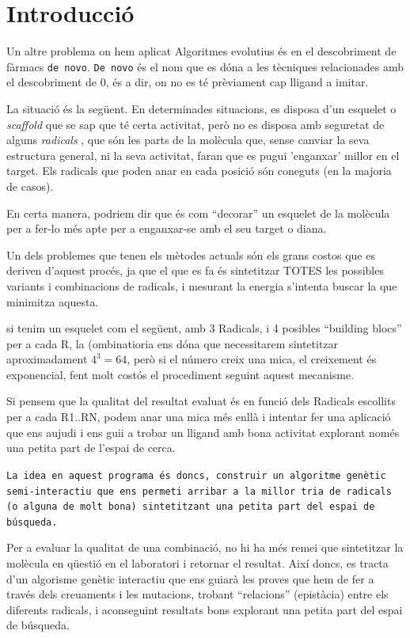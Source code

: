 \documentclass[titlepage,a4paper,12pt]{book}
\begin{document}
\tableofcontents
\section{Introducció} %
	\label{sec:Introduccio}
	Un altre problema on hem aplicat Algoritmes evolutius és en el descobriment
	de fàrmacs \texttt{de novo}.  \texttt{De novo} és el nom que es dóna a les
	tècniques relacionades amb el descobriment de 0, és a dir, on no es té
	prèviament cap lligand a imitar.

	La situació és la següent.  En determinades situacions, es disposa d'un
	esquelet o \textit{scaffold} que se sap que té certa activitat, però no es
	disposa amb seguretat de alguns \textit{radicals} , que són les parts de la
	molècula que, sense canviar la seva estructura general, ni la seva
	activitat, faran que es pugui 'enganxar' millor en el target.  Els radicals
	que poden anar en cada posició són coneguts (en la majoria de casos).

	En certa manera, podriem dir que és com ``decorar'' un esquelet de la
	molècula per a fer-lo més apte per a enganxar-se amb el seu target o diana.

	Un dels problemes que tenen els mètodes actuals són els grans costos
	que es deriven d'aquest procés, ja que el que es fa és sintetitzar TOTES les
possibles variants i combinacions de radicals, i mesurant la energia %
	s'intenta buscar la que minimitza aquesta.

	si tenim un esquelet com el següent, amb 3 Radicals, i 4 posibles ``building
	blocs'' per a cada R, la (ombinatioria ens dóna que necessitarem sintetitzar
	aproximadament $4^3 = 64 $, però si el número creix una mica, el creixement
	és exponencial, fent molt costós el procediment seguint aquest mecanisme.

	Si pensem que la qualitat del resultat evaluat és en funció dels Radicals
	escollits per a cada R1..RN, podem anar una mica més enllà i intentar fer
	una aplicació que ens aujudi i ens guii a trobar un lligand amb bona
	activitat explorant només una petita part de l'espai de cerca.
	
	\texttt{La idea en aquest programa és doncs, construir un algoritme genètic
	semi-interactiu que ens permeti arribar a la millor tria de radicals (o
		alguna de molt bona) sintetitzant una petita part del espai de búsqueda.}

	Per a evaluar la qualitat de una combinació, no hi ha més remei que
	sintetitzar la molècula en qüestió en el laboratori i retornar el resultat.
	Així doncs, es tracta d'un algorisme genètic interactiu %
	que ens guiarà les proves que hem de fer a través dels creuaments i les
	mutacions, trobant ``relacions'' (epistàcia) entre els diferents radicals, i
	aconseguint resultats bons explorant una petita part del espai de búsqueda.
\end{document}

